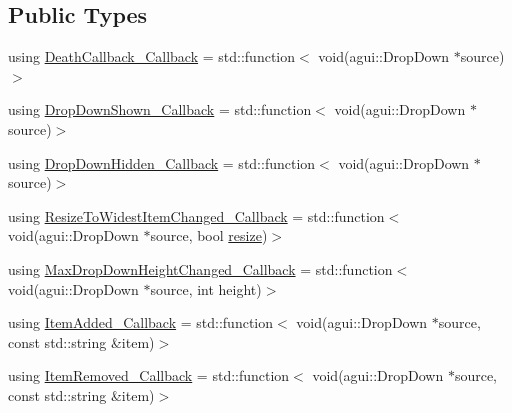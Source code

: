 \subsection*{Public Types}
\begin{DoxyCompactItemize}
\item 
using \mbox{\hyperlink{classec_1_1_generic_drop_down_listener_a72a84eeb2fdcc0eae78b78c53a59db3b}{Death\+Callback\+\_\+\+Callback}} = std\+::function$<$ void(agui\+::\+Drop\+Down $\ast$source)$>$
\item 
using \mbox{\hyperlink{classec_1_1_generic_drop_down_listener_ac5e0a45750cc64cb003f20d438047ddd}{Drop\+Down\+Shown\+\_\+\+Callback}} = std\+::function$<$ void(agui\+::\+Drop\+Down $\ast$source)$>$
\item 
using \mbox{\hyperlink{classec_1_1_generic_drop_down_listener_ae0548e780805b39f5817e6659932b478}{Drop\+Down\+Hidden\+\_\+\+Callback}} = std\+::function$<$ void(agui\+::\+Drop\+Down $\ast$source)$>$
\item 
using \mbox{\hyperlink{classec_1_1_generic_drop_down_listener_a3a4f9e1a8d9e016ea30e8cc781b8bcb9}{Resize\+To\+Widest\+Item\+Changed\+\_\+\+Callback}} = std\+::function$<$ void(agui\+::\+Drop\+Down $\ast$source, bool \mbox{\hyperlink{namespaceec_a84e452d7f020435b50e2c18e7cdca968}{resize}})$>$
\item 
using \mbox{\hyperlink{classec_1_1_generic_drop_down_listener_a4acbadec20937340572893a989e248f1}{Max\+Drop\+Down\+Height\+Changed\+\_\+\+Callback}} = std\+::function$<$ void(agui\+::\+Drop\+Down $\ast$source, int height)$>$
\item 
using \mbox{\hyperlink{classec_1_1_generic_drop_down_listener_a3b5721d086e03a50097fa2bd37e4030a}{Item\+Added\+\_\+\+Callback}} = std\+::function$<$ void(agui\+::\+Drop\+Down $\ast$source, const std\+::string \&item)$>$
\item 
using \mbox{\hyperlink{classec_1_1_generic_drop_down_listener_ad1513561f8a3a3614e207797df83e730}{Item\+Removed\+\_\+\+Callback}} = std\+::function$<$ void(agui\+::\+Drop\+Down $\ast$source, const std\+::string \&item)$>$
\end{DoxyCompactItemize}
